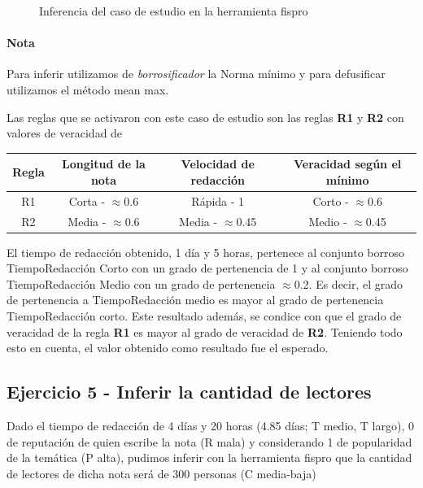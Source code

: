 \documentclass{article}
\begin{document}
\begin{figure}[H]
	\centering
	\caption{Inferencia del caso de estudio en la herramienta fispro}
\end{figure}

\paragraph{Nota} Para inferir utilizamos de \textit{borrosificador} la Norma mínimo y para defusificar utilizamos el método mean max.

\vspace{3mm}
Las reglas que se activaron con este caso de estudio son las reglas \textbf{R1} y \textbf{R2} con valores de veracidad de

\begin{table}[H]
	\centering
	\begin{tabular}{c|c c|c}
		Regla&Longitud de la nota&Velocidad de redacción&Veracidad según el mínimo\\
		\hline
		R1&Corta - $\approx$0.6&Rápida - 1&Corto - $\approx$0.6\\
		R2&Media - $\approx$0.6&Media - $\approx$0.45&Medio - $\approx$0.45\\
	\end{tabular}
\end{table}

El tiempo de redacción obtenido, 1 día y 5 horas, pertenece al conjunto borroso TiempoRedacción Corto con un grado de pertenencia de 1 y al conjunto borroso TiempoRedacción Medio con un grado de pertenencia $\approx$0.2. Es decir, el grado de pertenencia a TiempoRedacción medio es mayor al grado de pertenencia TiempoRedacción corto. Este resultado además, se condice con que el grado de veracidad de la regla \textbf{R1} es mayor al grado de veracidad de \textbf{R2}. Teniendo todo esto en cuenta, el valor obtenido como resultado fue el esperado.

\pagebreak
\subsection*{Ejercicio 5 - Inferir la cantidad de lectores}
Dado el tiempo de redacción de 4 días y 20 horas (4.85 días; T medio, T largo), 0 de reputación de quien escribe la nota (R mala) y considerando 1 de popularidad de la temática (P alta), pudimos inferir con la herramienta fispro que la cantidad de lectores de dicha nota será de 300 personas (C media-baja)
\end{document}
